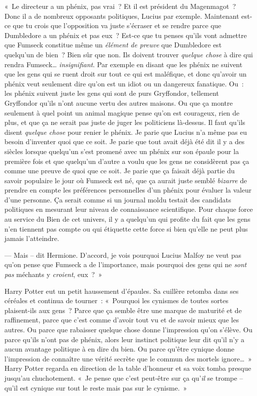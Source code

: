 «~Le directeur a un phénix, pas vrai~?
Et il est président du Magenmagot~?
Donc il a de nombreux opposants politiques, Lucius par exemple.
Maintenant est-ce que tu crois que l'opposition va juste s'écraser et se rendre parce que Dumbledore a un phénix et pas eux~?
Est-ce que tu penses qu'ils vont admettre que Fumseck constitue même un \emph{élément de preuve} que Dumbledore est quelqu'un de bien~?
Bien sûr que non.
Ils doivent trouver \emph{quelque chose} à dire qui rendra Fumseck…
\emph{insignifiant}.
Par exemple en disant que les phénix ne suivent que les gens qui se ruent droit sur tout ce qui est maléfique, et donc qu'avoir un phénix veut seulement dire qu'on est un idiot ou un dangereux fanatique.
Ou~: les phénix suivent juste les gens qui sont de purs Gryffondor, tellement Gryffondor qu'ils n'ont aucune vertu des autres maisons.
Ou que ça montre seulement à quel point un animal magique pense qu'on est courageux, rien de plus, et que ça ne serait pas juste de juger les politiciens là-dessus.
Il faut qu'ils disent \emph{quelque chose} pour renier le phénix.
Je parie que Lucius n'a même pas eu besoin d'inventer quoi que ce soit.
Je parie que tout avait déjà été dit il y a des siècles lorsque quelqu'un s'est promené avec un phénix sur son épaule pour la première fois et que quelqu'un d'autre a voulu que les gens ne considèrent pas ça comme une preuve de quoi que ce soit.
Je parie que ça faisait déjà partie du savoir populaire le jour où Fumseck est né, que ça aurait juste semblé \emph{bizarre} de prendre en compte les préférences personnelles d'un phénix pour évaluer la valeur d'une personne.
Ça serait comme si un journal moldu testait des candidats politiques en mesurant leur niveau de connaissance scientifique.
Pour chaque force au service du Bien de cet univers, il y a quelqu'un qui profite du fait que les gens n'en tiennent pas compte ou qui étiquette cette force si bien qu'elle ne peut plus jamais l'atteindre.

--- Mais -- dit Hermione.
D'accord, je vois pourquoi Lucius Malfoy ne veut pas qu'on pense que Fumseck a de l'importance, mais pourquoi des gens qui ne \emph{sont pas} méchants y \emph{croient}, eux~?~»

Harry Potter eut un petit haussement d'épaules.
Sa cuillère retomba dans ses céréales et continua de tourner~: «~Pourquoi les cynismes de toutes sortes plaisent-ils aux gens~?
Parce que ça semble être une marque de maturité et de raffinement, parce que c'est comme d'avoir tout vu et de savoir mieux que les autres.
Ou parce que rabaisser quelque chose donne l'impression qu'on s'élève.
Ou parce qu'ils n'ont pas de phénix, alors leur instinct politique leur dit qu'il n'y a aucun avantage politique à en dire du bien.
Ou parce qu'être cynique donne l'impression de connaître une vérité secrète que le commun des mortels ignore…~»
Harry Potter regarda en direction de la table d'honneur et sa voix tomba presque jusqu'au chuchotement.
«~Je pense que c'est peut-être sur ça qu'\emph{il} se trompe -- qu'il est cynique sur tout le reste mais pas sur le cynisme.~»


